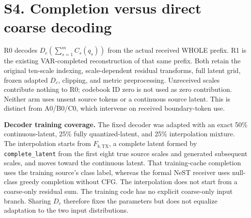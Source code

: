 \documentclass[11pt,letterpaper]{article}
\newcommand{\Dc}{D_c}
\begin{document}
\clearpage\section*{S4. Completion versus direct coarse decoding}
R0 decodes $\Dc(\sum_{s=1}^{m}C_s(q_s))$ from the actual received WHOLE prefix. R1 is the existing VAR-completed reconstruction of that same prefix. Both retain the original ten-scale indexing, scale-dependent residual transforms, full latent grid, frozen adapted $\Dc$, clipping, and metric preprocessing. Unreceived scales contribute nothing to R0; codebook ID zero is not used as zero contribution. Neither arm uses unsent source tokens or a continuous source latent. This is distinct from A0/B0/C0, which intervene on received boundary-token use.

\textbf{Decoder training coverage.} The fixed decoder was adapted with an exact 50\% continuous-latent, 25\% fully quantized-latent, and 25\% interpolation mixture. The interpolation starts from $F_{b,\mathrm{TX}}$, a complete latent formed by \texttt{complete\_latent} from the first eight true source scales and generated subsequent scales, and moves toward the continuous latent. That training-cache completion uses the training source's class label, whereas the formal NeST receiver uses null-class greedy completion without CFG. The interpolation does not start from a coarse-only residual sum. The training code has no explicit coarse-only input branch. Sharing $\Dc$ therefore fixes the parameters but does not equalize adaptation to the two input distributions.
\end{document}
